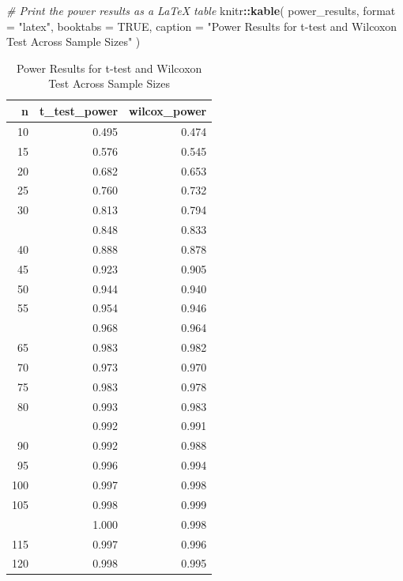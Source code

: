 \documentclass[
]{article}
\newenvironment{Shaded}{\begin{snugshade}}{\end{snugshade}}
\newcommand{\AttributeTok}[1]{\textcolor[rgb]{0.13,0.29,0.53}{#1}}
\newcommand{\CommentTok}[1]{\textcolor[rgb]{0.56,0.35,0.01}{\textit{#1}}}
\newcommand{\ConstantTok}[1]{\textcolor[rgb]{0.56,0.35,0.01}{#1}}
\newcommand{\FunctionTok}[1]{\textcolor[rgb]{0.13,0.29,0.53}{\textbf{#1}}}
\newcommand{\NormalTok}[1]{#1}
\newcommand{\SpecialCharTok}[1]{\textcolor[rgb]{0.81,0.36,0.00}{\textbf{#1}}}
\newcommand{\StringTok}[1]{\textcolor[rgb]{0.31,0.60,0.02}{#1}}
\begin{document}
\begin{Shaded}
\begin{Highlighting}[]
\CommentTok{\# Print the power results as a LaTeX table}
\NormalTok{knitr}\SpecialCharTok{::}\FunctionTok{kable}\NormalTok{(}
\NormalTok{  power\_results,}
  \AttributeTok{format =} \StringTok{"latex"}\NormalTok{,}
  \AttributeTok{booktabs =} \ConstantTok{TRUE}\NormalTok{,}
  \AttributeTok{caption =} \StringTok{"Power Results for t{-}test and Wilcoxon Test Across Sample Sizes"}
\NormalTok{)}
\end{Highlighting}
\end{Shaded}

\begin{table}

\caption{\label{tab:5}Power Results for t-test and Wilcoxon Test Across Sample Sizes}
\centering
\begin{tabular}[t]{rrr}
\toprule
n & t\_test\_power & wilcox\_power\\
\midrule
10 & 0.495 & 0.474\\
15 & 0.576 & 0.545\\
20 & 0.682 & 0.653\\
25 & 0.760 & 0.732\\
30 & 0.813 & 0.794\\
\addlinespace
35 & 0.848 & 0.833\\
40 & 0.888 & 0.878\\
45 & 0.923 & 0.905\\
50 & 0.944 & 0.940\\
55 & 0.954 & 0.946\\
\addlinespace
60 & 0.968 & 0.964\\
65 & 0.983 & 0.982\\
70 & 0.973 & 0.970\\
75 & 0.983 & 0.978\\
80 & 0.993 & 0.983\\
\addlinespace
85 & 0.992 & 0.991\\
90 & 0.992 & 0.988\\
95 & 0.996 & 0.994\\
100 & 0.997 & 0.998\\
105 & 0.998 & 0.999\\
\addlinespace
110 & 1.000 & 0.998\\
115 & 0.997 & 0.996\\
120 & 0.998 & 0.995\\
\bottomrule
\end{tabular}
\end{table}
\end{document}
